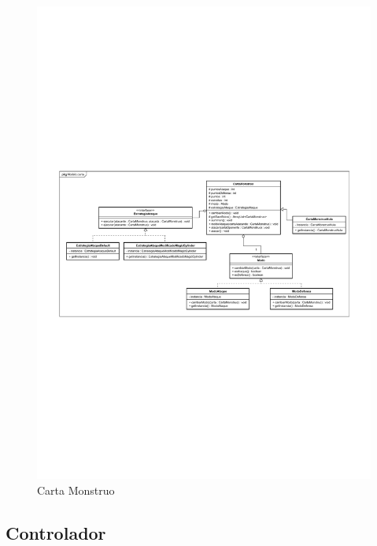 \begin{figure}[H]
	\centering
	\includegraphics[scale=0.8]{includes/class_CartaMonstruo}
	\caption{Carta Monstruo}
	\label{class_CartaMonstruo}
\end{figure}

\subsection{Controlador}

